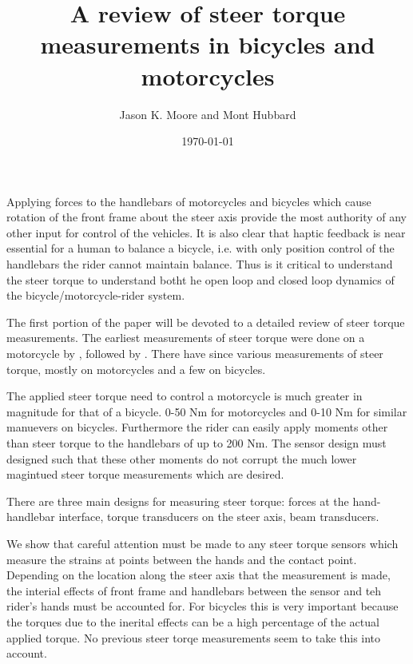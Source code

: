 \documentclass{article}
\title{A review of steer torque measurements in bicycles and motorcycles}
\author{Jason K. Moore and Mont Hubbard}
\date{\today}
\begin{document}
\maketitle

Applying forces to the handlebars of motorcycles and bicycles which cause
rotation of the front frame about the steer axis provide the most authority of
any other input for control of the vehicles. It is also clear that haptic
feedback is near essential for a human to balance a bicycle, i.e. with only
position control of the handlebars the rider cannot maintain balance. Thus is
it critical to understand the steer torque to understand botht he open loop and
closed loop dynamics of the bicycle/motorcycle-rider system.

The first portion of the paper will be devoted to a detailed review of steer
torque measurements. The earliest measurements of steer torque were done on a
motorcycle by \cite{Wilson-Jones1951}, followed by \cite{Kondo1955}. There have
since various measurements of steer torque, mostly on motorcycles and a few on
bicycles.

The applied steer torque need to control a motorcycle is much greater in
magnitude for that of a bicycle. 0-50 Nm for motorcycles and 0-10 Nm for
similar manuevers on bicycles. Furthermore the rider can easily apply moments
other than steer torque to the handlebars of up to 200 Nm. The sensor design
must designed such that these other moments do not corrupt the much lower
magintued steer torque measurements which are desired.

There are three main designs for measuring steer torque: forces at the
hand-handlebar interface, torque transducers on the steer axis, beam
transducers.

We show that careful attention must be made to any steer torque sensors which
measure the strains at points between the hands and the contact point.
Depending on the location along the steer axis that the measurement is made,
the interial effects of front frame and handlebars between the sensor and teh
rider's hands must be accounted for. For bicycles this is very important
because the torques due to the inerital effects can be a high percentage of the
actual applied torque. No previous steer torqe measurements seem to take this
into account.
\end{document}
